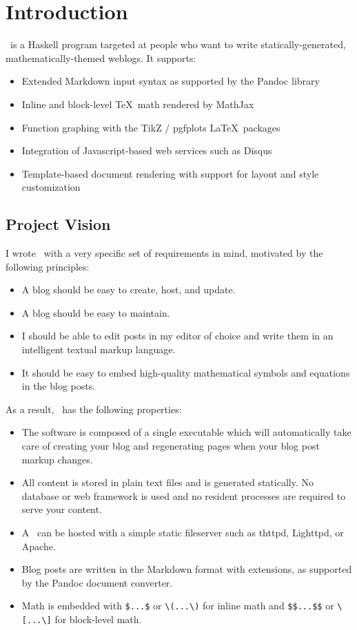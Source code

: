 \documentclass[11pt, letterpaper, oneside, titlepage]{book}
\begin{document}




\chapter{Introduction}

\mathblog\ is a Haskell program targeted at people who want to write
statically-generated, mathematically-themed weblogs.  It supports:

\begin{itemize}
\item{Extended Markdown input syntax as supported by the Pandoc
  library}
\item{Inline and block-level \TeX\ math rendered by MathJax}
\item{Function graphing with the TikZ / pgfplots \LaTeX\ packages}
\item{Integration of Javascript-based web services such as Disqus}
\item{Template-based document rendering with support for layout and
  style customization}
\end{itemize}

\section{Project Vision}

I wrote \mathblog\ with a very specific set of requirements in mind,
motivated by the following principles:

\begin{itemize}
\item{A blog should be easy to create, host, and update.}
\item{A blog should be easy to maintain.}
\item{I should be able to edit posts in my editor of choice and write
  them in an intelligent textual markup language.}
\item{It should be easy to embed high-quality mathematical symbols and
  equations in the blog posts.}
\end{itemize}

As a result, \mathblog\ has the following properties:

\begin{itemize}
\item{The software is composed of a single executable which will
  automatically take care of creating your blog and regenerating pages
  when your blog post markup changes.}
\item{All content is stored in plain text files and is generated
  statically.  No database or web framework is used and no resident
  processes are required to serve your content.}
\item{A \mathblog\ can be hosted with a simple static fileserver such
  as thttpd, Lighttpd, or Apache.}
\item{Blog posts are written in the Markdown format with extensions,
  as supported by the Pandoc document converter.}
\item{Math is embedded with \verb|$...$| or \verb|\(...\)| for inline
  math and \verb|$$...$$| or \verb|\[...\]| for block-level math.}
\end{itemize}
\end{document}
